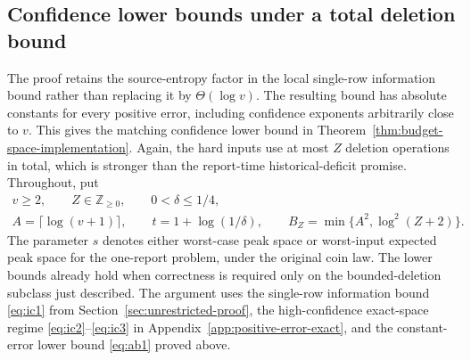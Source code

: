 \documentclass[11pt,letterpaper]{article}
\numberwithin{equation}{section}
\begin{document}
\subsection{Confidence lower bounds under a total deletion bound}
\label{sec:nearlinear-entropy-lower}

The proof retains the source-entropy factor in the local single-row information bound rather than replacing it by $\Theta(\log v)$.
The resulting bound has absolute constants for every positive error, including confidence exponents arbitrarily close to $v$.
This gives the matching confidence lower bound in Theorem~\ref{thm:budget-space-implementation}.
Again, the hard inputs use at most $Z$ deletion operations in total, which is stronger than the report-time historical-deficit promise.
Throughout, put
\[
 \begin{gathered}
 v\ge2,\qquad Z\in\mathbb Z_{\ge0},\qquad
 0<\delta\le1/4,\\
 A=\lceil\log(v+1)\rceil,\qquad t=1+\log(1/\delta),
 \qquad B_Z=\min\{A^2,\log^2(Z+2)\}.
 \end{gathered}
\]
The parameter $s$ denotes either worst-case peak space or worst-input expected peak space for the one-report problem, under the original coin law.
The lower bounds already hold when correctness is required only on the bounded-deletion subclass just described.
The argument uses the single-row information bound \eqref{eq:ic1} from Section~\ref{sec:unrestricted-proof}, the high-confidence exact-space regime \eqref{eq:ic2}--\eqref{eq:ic3} in Appendix~\ref{app:positive-error-exact}, and the constant-error lower bound \eqref{eq:ab1} proved above.
\end{document}
